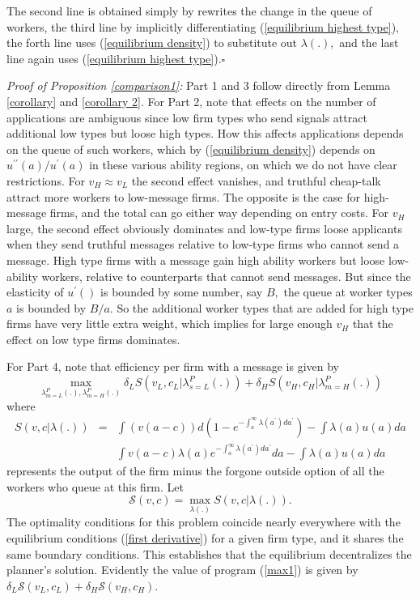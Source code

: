 \documentclass[12pt]{article}
\theoremstyle{plain}
\begin{document}
The second line is obtained simply by rewrites the change in the queue of
workers, the third line by implicitly differentiating (\ref{equilibrium
highest type}), the forth line uses (\ref{equilibrium density}) to
substitute out $\lambda (.),$ and the last line again uses (\ref{equilibrium
highest type}).$\square $

\bigskip \bigskip

\noindent \textit{Proof of Proposition \ref{comparison1}:} Part 1 and 3 follow
directly from Lemma \ref{corollary} and \ref{corollary 2}. For Part 2, note
that effects on the number of applications are ambiguous since low firm
types who send signals attract additional low types but loose high types.
How this affects applications depends on the queue of such workers, which by
(\ref{equilibrium density}) depends on $u^{\prime \prime }(a)/u^{\prime }(a)$
in these various ability regions, on which we do not have clear
restrictions. For $v_{H}\approx v_{L}$ the second effect vanishes, and
truthful cheap-talk attract more workers to low-message firms. The opposite
is the case for high-message firms, and the total can go either way
depending on entry costs. For $v_{H}$ large, the second effect obviously
dominates and low-type firms loose applicants when they send truthful
messages relative to low-type firms who cannot send a message. High type
firms with a message gain high ability workers but loose low-ability
workers, relative to counterparts that cannot send messages. But since the
elasticity of $u^{\prime }()$ is bounded by some number, say $B,$ the queue
at worker types $a$ is bounded by $B/a.$ So the additional worker types that
are added for high type firms have very little extra weight, which implies
for large enough $v_{H}$ that the effect on low type firms dominates.

For Part 4, note that efficiency per firm with a message is given by 
\begin{equation}
\max_{\lambda _{m=L}^{P}(.),\lambda _{m=H}^{P}(.)}\delta
_{L}S(v_{L},c_{L}|\lambda _{s=L}^{P}(.))+\delta _{H}S(v_{H},c_{H}|\lambda
_{m=H}^{P}(.))  \label{max1}
\end{equation}%
where 
\begin{eqnarray*}
S(v,c|\lambda (.)) &=&\int \left( v(a-c)\right) d\left(
1-e^{-\int_{a}^{\infty }\lambda (a^{\prime })da^{\prime }}\right) -\int
\lambda (a)u(a)da \\
&&\int v(a-c)\lambda (a)e^{-\int_{a}^{\infty }\lambda (a^{\prime
})da^{\prime }}da-\int \lambda (a)u(a)da
\end{eqnarray*}%
represents the output of the firm minus the forgone outside option of all
the workers who queue at this firm. Let 
\begin{equation}
\mathcal{S}(v,c)=\max_{\lambda (.)}S(v,c|\lambda (.)).  \label{max-by-type}
\end{equation}%
The optimality conditions for this problem coincide nearly everywhere with
the equilibrium conditions (\ref{first derivative}) for a given firm type,
and it shares the same boundary conditions. This establishes that the
equilibrium decentralizes the planner's solution. Evidently the value of
program (\ref{max1}) is given by $\delta _{L}\mathcal{S}(v_{L},c_{L})+\delta
_{H}\mathcal{S}(v_{H},c_{H}).$
\end{document}
